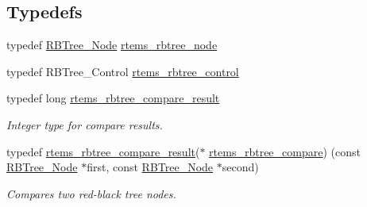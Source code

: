 \subsection*{Typedefs}
\begin{DoxyCompactItemize}
\item 
typedef \mbox{\hyperlink{structRBTree__Node}{R\+B\+Tree\+\_\+\+Node}} \mbox{\hyperlink{group__ClassicRBTrees_gaef47fc7fc61856c9afbf7f18a26ff80d}{rtems\+\_\+rbtree\+\_\+node}}
\item 
typedef R\+B\+Tree\+\_\+\+Control \mbox{\hyperlink{group__ClassicRBTrees_ga21fe446d0b3cb8b25c814e93357753ef}{rtems\+\_\+rbtree\+\_\+control}}
\item 
typedef long \mbox{\hyperlink{group__ClassicRBTrees_gaf0f8f451a211561514907b1dc47a6d9d}{rtems\+\_\+rbtree\+\_\+compare\+\_\+result}}
\begin{DoxyCompactList}\small\item\em Integer type for compare results. \end{DoxyCompactList}\item 
typedef \mbox{\hyperlink{group__ClassicRBTrees_gaf0f8f451a211561514907b1dc47a6d9d}{rtems\+\_\+rbtree\+\_\+compare\+\_\+result}}($\ast$ \mbox{\hyperlink{group__ClassicRBTrees_gae5f1cdaef7551cbee5a877e65f442b93}{rtems\+\_\+rbtree\+\_\+compare}}) (const \mbox{\hyperlink{structRBTree__Node}{R\+B\+Tree\+\_\+\+Node}} $\ast$first, const \mbox{\hyperlink{structRBTree__Node}{R\+B\+Tree\+\_\+\+Node}} $\ast$second)
\begin{DoxyCompactList}\small\item\em Compares two red-\/black tree nodes. \end{DoxyCompactList}\end{DoxyCompactItemize}

